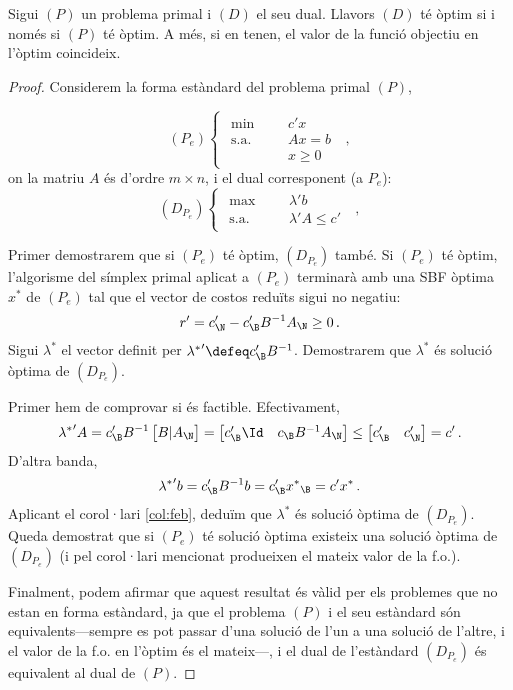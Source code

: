 \begin{teo}\label{teo:dualitat-fort}
    Sigui $\left(P\right)$ un problema primal i $\left(D\right)$ el seu dual. Llavors $(D)$ té òptim si i només si $(P)$ té òptim. A més, si en tenen, el valor de la funció objectiu en l'òptim coincideix.
    \begin{proof}
    	Considerem la forma estàndard del problema primal $(P)$,
    	
    	\[
    		(P_e)
    		\begin{cases}
    		\begin{aligned}
			   	\min 			&&& c'x\\
	    		\text{s.a.}		&&& Ax = b\\
	    						&&& x\ge0
    		\end{aligned}
    		\end{cases}\ ,
    	\]
    	on la matriu $A$ és d'ordre $m\times n$, i el dual corresponent (a $P_e$):
    	\[
	    	(D_{P_e})
	    	\begin{cases}
	    	\begin{aligned}
	    	\max 			&&& \lambda'b\\
	    	\text{s.a.}		&&& \lambda'A \le c'
	    	\end{aligned}
	    	\end{cases}\ ,
    	\]
    	
    	Primer demostrarem que si $(P_e)$ té òptim, $(D_{P_e})$ també. Si $(P_e)$ té òptim, l'algorisme del símplex primal aplicat a $(P_e)$ terminarà amb una SBF òptima $x^\ast$ de $(P_e)$ tal que el vector de costos reduïts sigui no negatiu: \[r' = c_\N '- c_\B' B^{-1} A_\N \ge 0\,.\] Sigui $\lambda^\ast$ el vector definit per ${\lambda^\ast}'\defeq c_\B'B^{-1}$. Demostrarem que $\lambda^\ast$ és solució òptima de $(D_{P_e})$.
    	
    	Primer hem de comprovar si és factible. Efectivament, 
    	\[
    		{\lambda^\ast}'A = 
    		c_\B' B^{-1}
    		\begin{bmatrix}
		   		B 	\vert 	A_\N
    		\end{bmatrix} =
    		\begin{bmatrix}
    			c_\B' \Id & c_\B B^{-1} A_\N    			
    		\end{bmatrix}
    		\le
    		\begin{bmatrix}
	    		c_\B' 	&c_\N'
    		\end{bmatrix}
    		= c'\,.
    	\]
    	D'altra banda, \[{\lambda^\ast}'b = c_\B' B^{-1} b = c_\B' {x^\ast}_\B = c'{x^\ast}\,. \] Aplicant el corol·lari \ref{col:feb}, deduïm que $\lambda^\ast$ és solució òptima de $(D_{P_e})$. Queda demostrat que si $(P_e)$ té solució òptima existeix una solució òptima de $(D_{P_e})$ (i pel corol·lari mencionat produeixen el mateix valor de la f.o.).
    	
    	Finalment, podem afirmar que aquest resultat és vàlid per els problemes que no estan en forma estàndard, ja que el problema $(P)$ i el seu estàndard són equivalents---sempre es pot passar d'una solució de l'un a una solució de l'altre, i el valor de la f.o. en l'òptim és el mateix---, i el dual de l'estàndard $(D_{P_e})$ és equivalent al dual de $(P)$.
    \end{proof}
\end{teo}

